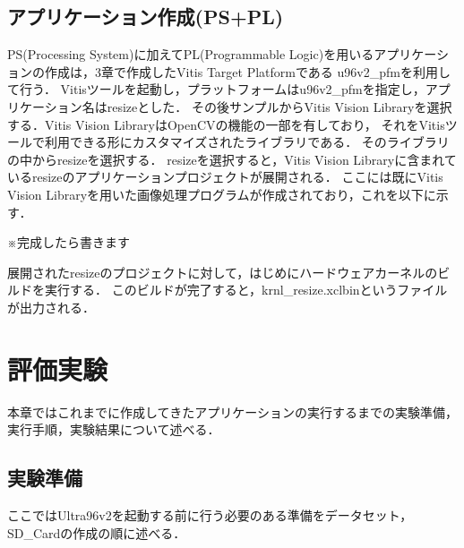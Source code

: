 \documentclass[11pt,a4j]{jreport}
\begin{document}
\section{アプリケーション作成(PS+PL)}
PS(Processing System)に加えてPL(Programmable Logic)を用いるアプリケーションの作成は，3章で作成したVitis Target Platformである
u96v2_pfmを利用して行う．
Vitisツールを起動し，プラットフォームはu96v2_pfmを指定し，アプリケーション名はresizeとした．
その後サンプルからVitis Vision Libraryを選択する．Vitis Vision LibraryはOpenCVの機能の一部を有しており，
それをVitisツールで利用できる形にカスタマイズされたライブラリである．
そのライブラリの中からresizeを選択する．
resizeを選択すると，Vitis Vision Libraryに含まれているresizeのアプリケーションプロジェクトが展開される．
ここには既にVitis Vision Libraryを用いた画像処理プログラムが作成されており，これを以下に示す．

※完成したら書きます

%
%
%

展開されたresizeのプロジェクトに対して，はじめにハードウェアカーネルのビルドを実行する．
このビルドが完了すると，krnl_resize.xclbinというファイルが出力される．
\chapter{評価実験}
本章ではこれまでに作成してきたアプリケーションの実行するまでの実験準備，実行手順，実験結果について述べる．
\section{実験準備}
ここではUltra96v2を起動する前に行う必要のある準備をデータセット，SD_Cardの作成の順に述べる．
\end{document}
